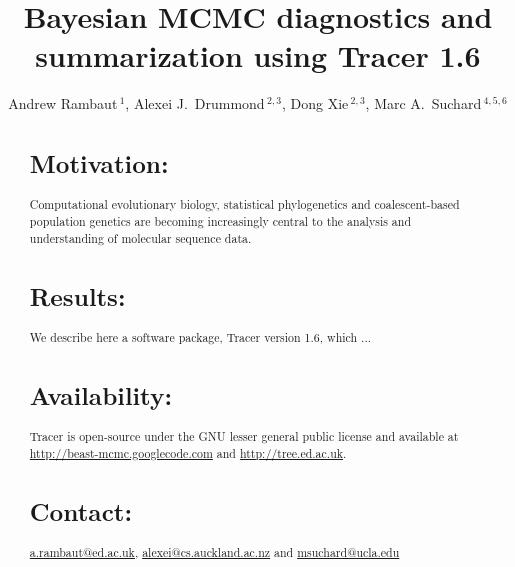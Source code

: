 \documentclass{bioinfo}
\begin{document}

\title[Tracer 1.6]{Bayesian MCMC diagnostics and summarization using Tracer 1.6}

\author[Rambaut \textit{et~al}]{ Andrew Rambaut\,$^{1}$, Alexei J.~Drummond\,$^{2,3}$, Dong Xie\,$^{2,3}$, Marc A.~Suchard\,$^{4,5,6}$}

\address{
$^{1}$Institute of Evolutionary Biology, University of Edinburgh, Edinburgh, UK\\
$^{2}$Department of Computer Science, University of Auckland, Auckland, NZ\\
$^{3}$Centre for Computational Evolution, University of Auckland, Auckland, NZ\\
$^{4,5}$Departments of Biomathematics and Human Genetics, David Geffen School of Medicine at UCLA, and \\
$^{6}$Department of Biostatistics, UCLA Fielding School of Public Health, University of California, Los Angeles, USA \\
}



\maketitle


\begin{abstract}

\section{Motivation:}
Computational evolutionary biology, statistical phylogenetics and coalescent-based population genetics are becoming increasingly central to the analysis and understanding of molecular sequence data. 
\section{Results:}
We describe here a software package, Tracer version 1.6, which ... 
\section{Availability:}
Tracer is open-source under the GNU lesser general public license and available at 
\url{http://beast-mcmc.googlecode.com}  %
and  \href{http://tree.ed.ac.uk/software/tracer}{\url{http://tree.ed.ac.uk}}.

\section{Contact:} 
\href{a.rambaut@ed.ac.uk}{\url{a.rambaut@ed.ac.uk}}, 
\href{alexei@cs.auckland.ac.nz}{\url{alexei@cs.auckland.ac.nz}}
and 
\href{msuchard@ucla.edu}{\url{msuchard@ucla.edu}}

\end{abstract}
\end{document}
